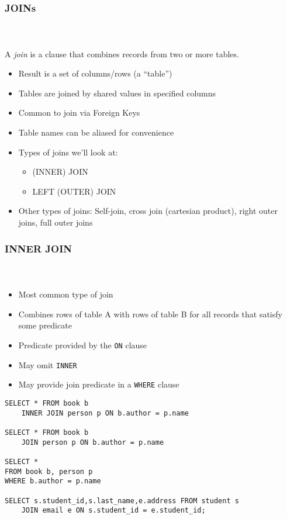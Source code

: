 \documentclass{beamer}
\begin{document}
\begin{frame}[fragile]
  \frametitle{JOINs}
  \framesubtitle{~}

A \emph{join} is a clause that combines records from two or more tables.

\begin{itemize}
  \item Result is a set of columns/rows (a ``table'')
  \item Tables are joined by shared values in specified columns
  \item Common to join via Foreign Keys
  \item Table names can be aliased for convenience
  \item Types of joins we'll look at:
  \begin{itemize}
    \item (INNER) JOIN
    \item LEFT (OUTER) JOIN
  \end{itemize}
  \item Other types of joins: Self-join, cross join (cartesian product), right outer joins, full outer joins
\end{itemize}

\end{frame}

\begin{frame}
  \frametitle{INNER JOIN}
  \framesubtitle{~}

\begin{itemize}
  \item Most common type of join
  \item Combines rows of table A with rows of table B for all records that satisfy some predicate
  \item Predicate provided by the \texttt{ON} clause
  \item May omit \texttt{INNER}
  \item May provide join predicate in a \texttt{WHERE} clause
\end{itemize}

\framebreak

\begin{verbatim}
SELECT * FROM book b
    INNER JOIN person p ON b.author = p.name

SELECT * FROM book b
    JOIN person p ON b.author = p.name

SELECT *
FROM book b, person p
WHERE b.author = p.name

SELECT s.student_id,s.last_name,e.address FROM student s
    JOIN email e ON s.student_id = e.student_id;
\end{verbatim}

\end{frame}
\end{document}
